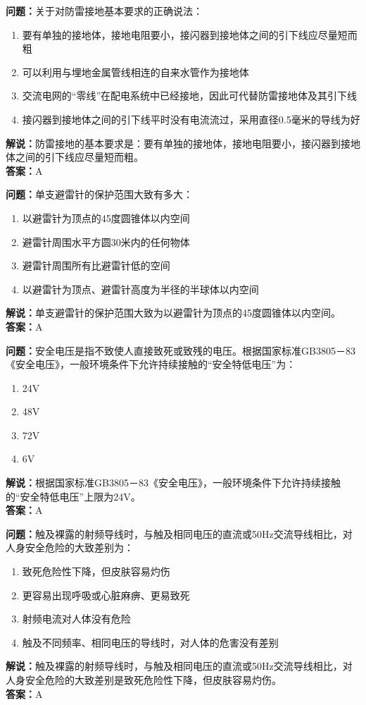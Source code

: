 \documentclass{ctexbook}%
\begin{document}
\textbf{问题：}关于对防雷接地基本要求的正确说法：
\begin{enumerate}[label=\Alph*), leftmargin=3em]
\item 要有单独的接地体，接地电阻要小，接闪器到接地体之间的引下线应尽量短而粗
\item 可以利用与埋地金属管线相连的自来水管作为接地体
\item 交流电网的“零线”在配电系统中已经接地，因此可代替防雷接地体及其引下线
\item 接闪器到接地体之间的引下线平时没有电流流过，采用直径0.5毫米的导线为好
\end{enumerate}
\textbf{解说：}防雷接地的基本要求是：要有单独的接地体，接地电阻要小，接闪器到接地体之间的引下线应尽量短而粗。\\
\textbf{答案：}A

\textbf{问题：}单支避雷针的保护范围大致有多大：
\begin{enumerate}[label=\Alph*), leftmargin=3em]
\item 以避雷针为顶点的45度圆锥体以内空间
\item 避雷针周围水平方圆30米内的任何物体
\item 避雷针周围所有比避雷针低的空间
\item 以避雷针为顶点、避雷针高度为半径的半球体以内空间
\end{enumerate}
\textbf{解说：}单支避雷针的保护范围大致为以避雷针为顶点的45度圆锥体以内空间。\\
\textbf{答案：}A

\textbf{问题：}安全电压是指不致使人直接致死或致残的电压。根据国家标准GB3805－83《安全电压》，一般环境条件下允许持续接触的“安全特低电压”为：
\begin{enumerate}[label=\Alph*), leftmargin=3em]
\item 24V
\item 48V
\item 72V
\item 6V
\end{enumerate}
\textbf{解说：}根据国家标准GB3805－83《安全电压》，一般环境条件下允许持续接触的“安全特低电压”上限为24V。\\
\textbf{答案：}A

\textbf{问题：}触及裸露的射频导线时，与触及相同电压的直流或50Hz交流导线相比，对人身安全危险的大致差别为：
\begin{enumerate}[label=\Alph*), leftmargin=3em]
\item 致死危险性下降，但皮肤容易灼伤
\item 更容易出现呼吸或心脏麻痹、更易致死
\item 射频电流对人体没有危险
\item 触及不同频率、相同电压的导线时，对人体的危害没有差别
\end{enumerate}
\textbf{解说：}触及裸露的射频导线时，与触及相同电压的直流或50Hz交流导线相比，对人身安全危险的大致差别是致死危险性下降，但皮肤容易灼伤。\\
\textbf{答案：}A
\end{document}
